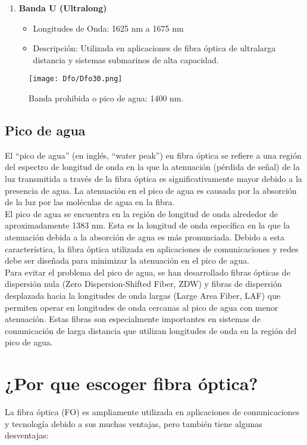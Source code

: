 \documentclass[
	12pt, %
	fleqn, %
	a4paper, %
	oneside, %
]{LegrandOrangeBook}
\begin{document}
\begin{enumerate}
    \item \textbf{Banda U (Ultralong)}
    \begin{itemize}
        \item Longitudes de Onda: 1625 nm a 1675 nm
        \item Descripción: Utilizada en aplicaciones de fibra óptica de ultralarga distancia y sistemas submarinos de alta capacidad.
    \end{itemize}
\end{enumerate}
\begin{figure}[H]
\centering
\texttt{[image: Dfo/Dfo30.png]}
\caption{Banda prohibida o pico de agua: 1400 nm.}
\end{figure}
\subsection{Pico de agua}
El ``pico de agua'' (en inglés, ``water peak'') en fibra óptica se refiere a una región del espectro de longitud de onda en la que la atenuación (pérdida de señal) de la luz transmitida a través de la fibra óptica es significativamente mayor debido a la presencia de agua. La atenuación en el pico de agua es causada por la absorción de la luz por las moléculas de agua en la fibra.\\
El pico de agua se encuentra en la región de longitud de onda alrededor de aproximadamente 1383 nm. Esta es la longitud de onda específica en la que la atenuación debida a la absorción de agua es más pronunciada. Debido a esta característica, la fibra óptica utilizada en aplicaciones de comunicaciones y redes debe ser diseñada para minimizar la atenuación en el pico de agua.\\
Para evitar el problema del pico de agua, se han desarrollado fibras ópticas de dispersión nula (Zero Dispersion-Shifted Fiber, ZDW) y fibras de dispersión desplazada hacia la longitudes de onda largas (Large Area Fiber, LAF) que permiten operar en longitudes de onda cercanas al pico de agua con menor atenuación. Estas fibras son especialmente importantes en sistemas de comunicación de larga distancia que utilizan longitudes de onda en la región del pico de agua.

\section{¿Por que escoger fibra óptica?}
La fibra óptica (FO) es ampliamente utilizada en aplicaciones de comunicaciones y tecnología debido a sus muchas ventajas, pero también tiene algunas desventajas:
\end{document}

